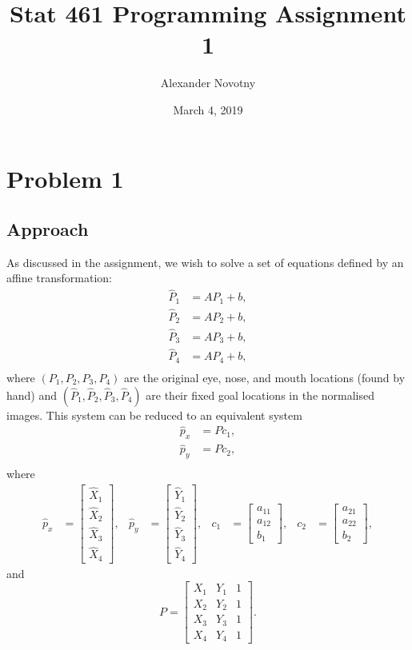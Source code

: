 \documentclass[dvipsnames]{article}
\title{Stat 461 Programming Assignment 1}
\date{March 4, 2019}
\author{Alexander Novotny}
\begin{document}

\maketitle

\section*{Problem 1}
\subsection*{Approach}
As discussed in the assignment, we wish to solve a set of equations defined by an affine transformation:
\begin{align*}
	\hat{P}_1 &= AP_1 + b,\\
	\hat{P}_2 &= AP_2 + b,\\
	\hat{P}_3 &= AP_3 + b,\\
	\hat{P}_4 &= AP_4 + b,\\
\end{align*}
where $(P_1, P_2, P_3, P_4)$ are the original eye, nose, and mouth locations (found by hand) and $(\hat{P}_1, \hat{P}_2, \hat{P}_3, \hat{P}_4)$ are their fixed goal locations in the normalised images. This system can be reduced to an equivalent system
\begin{align*}
	\hat{p}_x &= Pc_1,\\
	\hat{p}_y &= Pc_2,\\
\end{align*}
where
\begin{align*}
	\hat{p}_x &= \begin{bmatrix}\hat{X}_1\\\hat{X}_2\\\hat{X}_3\\\hat{X}_4\end{bmatrix}, &
	\hat{p}_y &= \begin{bmatrix}\hat{Y}_1\\\hat{Y}_2\\\hat{Y}_3\\\hat{Y}_4\end{bmatrix}, &
	c_1 &= \begin{bmatrix}a_{11}\\a_{12}\\b_1\end{bmatrix}, &
	c_2 &= \begin{bmatrix}a_{21}\\a_{22}\\b_2\end{bmatrix},
\end{align*}
and
\[
	P =
	\begin{bmatrix}
		X_1 & Y_1 & 1\\
		X_2 & Y_2 & 1\\
		X_3 & Y_3 & 1\\
		X_4 & Y_4 & 1
	\end{bmatrix}.
\]
\end{document}
